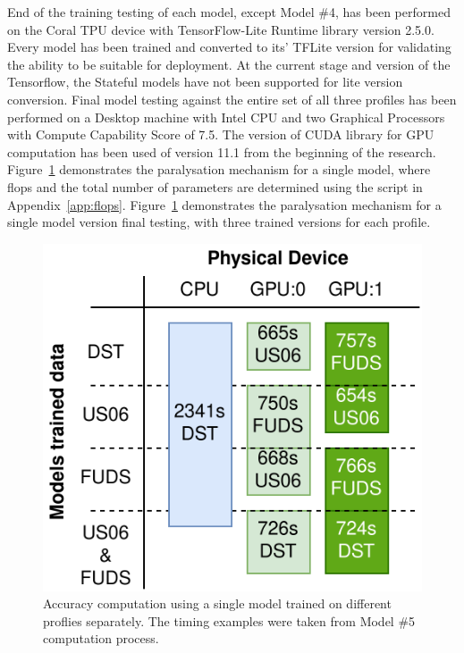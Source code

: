 %
%
End of the training testing of each model, except Model \#4, has been performed on the Coral TPU device with TensorFlow-Lite Runtime library version 2.5.0.
Every model has been trained and converted to its' TFLite version for validating the ability to be suitable for deployment.
At the current stage and version of the Tensorflow, the Stateful models have not been supported for lite version conversion.
Final model testing against the entire set of all three profiles has been performed on a Desktop machine with Intel CPU and two Graphical Processors with Compute Capability Score of 7.5.
The version of CUDA library for GPU computation has been used of version 11.1 from the beginning of the research.
%
%
{
\mbox{Figure~\ref{fig:device_compute}} demonstrates the paralysation mechanism for a single model, where flops and the total number of parameters are determined using the script in Appendix~\ref{app:flops}.
}
{
\mbox{Figure~\ref{fig:device_compute}} demonstrates the paralysation mechanism for a single model version final testing, with three trained versions for each profile.
}
\begin{figure}[ht]
    \centering
    \includegraphics[width=\columnwidth]{II_Body/images/Accuracy_Compute.png}
    \caption{Accuracy computation using a single model trained on different proflies separately. The timing examples were taken from Model \#5 computation process.}
    \label{fig:device_compute}
\end{figure}
